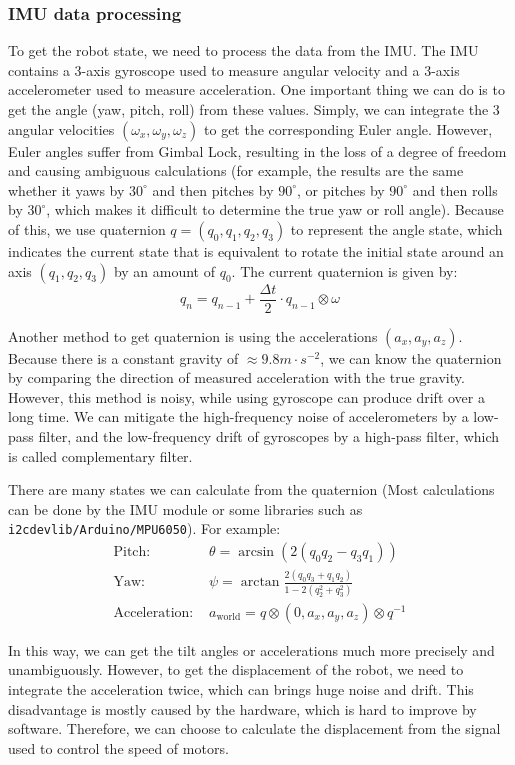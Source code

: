 \documentclass[9pt,a4paper,twocolumn]{tau-class/tau}
\begin{document}
\subsubsection{IMU data processing}
To get the robot state, we need to process the data from the IMU. The IMU contains a 3-axis gyroscope used to measure angular velocity and a 3-axis accelerometer used to measure acceleration. One important thing we can do is to get the angle (yaw, pitch, roll) from these values. Simply, we can integrate the 3 angular velocities $(\omega_x,\omega_y,\omega_z)$ to get the corresponding Euler angle. However, Euler angles suffer from Gimbal Lock, resulting in the loss of a degree of freedom and causing ambiguous calculations (for example, the results are the same whether it yaws by $30^\circ$ and then pitches by $90^\circ$, or pitches by $90^\circ$ and then rolls by $30^\circ$, which makes it difficult to determine the true yaw or roll angle). Because of this, we use quaternion $q=(q_0,q_1,q_2,q_3)$ to represent the angle state, which indicates the current state that is equivalent to rotate the initial state around an axis $(q_1,q_2,q_3)$ by an amount of $q_0$. The current quaternion is given by:
\begin{equation}
	q_n=q_{n-1}+\frac{\Delta t}{2}\cdot q_{n-1}\otimes\omega
\end{equation}

Another method to get quaternion is using the accelerations $(a_x,a_y,a_z)$. Because there is a constant gravity of $\approx9.8m\cdot s^{-2}$, we can know the quaternion by comparing the direction of measured acceleration with the true gravity. However, this method is noisy, while using gyroscope can produce drift over a long time. We can mitigate the high-frequency noise of accelerometers by a low-pass filter, and the low-frequency drift of gyroscopes by a high-pass filter, which is called complementary filter.

There are many states we can calculate from the quaternion (Most calculations can be done by the IMU module or some libraries such as \texttt{i2cdevlib/Arduino/MPU6050}). For example:
\begin{align}
	\text{Pitch: }&\theta=\arcsin{(2(q_0q_2-q_3q_1))}\\
	\text{Yaw: }&\psi=\arctan{\frac{2(q_0q_3+q_1q_2)}{1-2(q_2^2+q_3^2)}}\\
	\text{Acceleration: }&a_\text{world}=q\otimes(0,a_x,a_y,a_z)\otimes q^{-1}
\end{align}

In this way, we can get the tilt angles or accelerations much more precisely and unambiguously. However, to get the displacement of the robot, we need to integrate the acceleration twice, which can brings huge noise and drift. This disadvantage is mostly caused by the hardware, which is hard to improve by software. Therefore, we can choose to calculate the displacement from the signal used to control the speed of motors.
\end{document}
